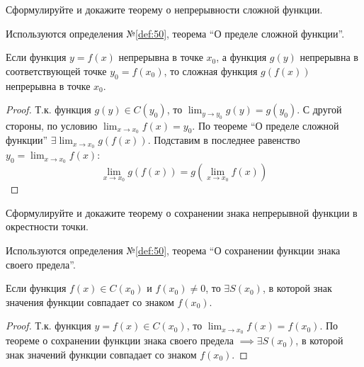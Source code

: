 \begin{question}
    Сформулируйте и докажите теорему о непрерывности сложной функции.
\end{question}
\begin{used}
    Используются определения №\ref{def:50}, теорема ``О пределе сложной функции''.
\end{used}
\begin{theorem}
    Если функция $y = f(x)$ непрерывна в точке $x_0$, а функция $g(y)$ непрерывна в соответствующей точке $y_0 = f(x_0)$, то сложная функция $g(f(x))$ непрерывна в точке $x_0$.
\end{theorem}
\begin{proof}
    Т.к. функция $g\left( y \right) \in C(y_0)$, то $\lim_{y \to y_0} g(y) = g(y_0)$.
    С другой стороны, по условию $\lim_{x \to x_0} f(x) = y_0$.
    По теореме ``О пределе сложной функции'' $\exists \lim_{x \to x_0} g(f(x))$.
    Подставим в последнее равенство $y_0 = \lim_{x \to x_0} f(x)$: \[
        \lim_{x \to x_0} g(f(x)) = g(\lim_{x \to x_0} f(x))
    \]  
\end{proof}
\pagebreak



\begin{question}
    Сформулируйте и докажите теорему о сохранении знака непрерывной функции в окрестности точки.
\end{question}
\begin{used}
    Используются определения №\ref{def:50}, теорема ``О сохранении функции знака своего предела''.
\end{used}
\begin{theorem}
    Если функция $f(x) \in C(x_0)$ и $f(x_0) \neq 0$, то $\exists S(x_0)$, в которой знак значения функции совпадает со знаком $f(x_0)$.
\end{theorem}
\begin{proof}
    Т.к. функция $y = f(x) \in C(x_0)$, то $\lim_{x \to x_0} f(x) = f(x_0)$. 
    По теореме о сохранении функции знака своего предела $\implies \exists S(x_0)$, в которой знак значений функции совпадает со знаком $f(x_0)$.
\end{proof}
\pagebreak



